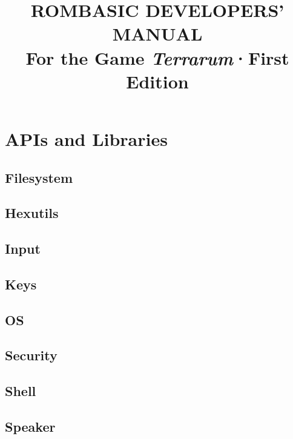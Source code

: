 \documentclass[10pt, stock]{memoir}
\title{\textbf{ROMBASIC DEVELOPERS' \\ MANUAL} \\ \vspace{7mm} \large For the Game \emph{Terrarum}\quad ·\quad First Edition}
\date{}
\author{}
\let\oldsection\section
\renewcommand\section{\clearpage\oldsection}
\begin{document}
\begin{titlingpage}
\maketitle{}
\end{titlingpage}

\setcounter{page}{3}

\tableofcontents*



\chapter{APIs and Libraries}

\section{Filesystem}


\section{Hexutils}


\section{Input}


\section{Keys}


\section{OS}


\section{Security}


\section{Shell}


\section{Speaker}

\end{document}
